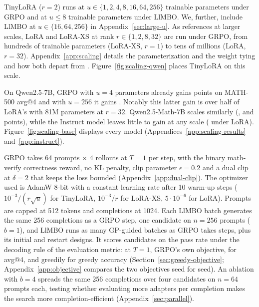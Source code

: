 \documentclass[twoside]{article}
\newcommand{\llmbo}{LlMBO}
\begin{document}
TinyLoRA ($r = 2$) runs at $u \in \{1, 2, 4, 8, 16, 64, 256\}$ trainable parameters under GRPO and at $u \le 8$ trainable parameters under \llmbo{}. We, further, include \llmbo{} at $u \in \{16, 64, 256\}$ in Appendix~\ref{sec:large-u}. As references at larger scales, LoRA and LoRA-XS at rank $r \in \{1, 2, 8, 32\}$ are run under GRPO, from hundreds of trainable parameters (LoRA-XS, $r = 1$) to tens of millions (LoRA, $r = 32$). Appendix~\ref{app:scaling} details the parameterization and the weight tying and how both depart from \citet{morris2026learning}. Figure~\ref{fig:scaling-qwen} places TinyLoRA on this scale. 

On Qwen2.5-7B, GRPO with $u = 4$ parameters already gains \gainGrpoMeanQwenUFourMathFive{} points on MATH-500 avg@4 and with $u = 256$ it gains \gainGrpoMeanQwenUTwoFiftySixMathFive{}. Notably this latter gain is over half of LoRA's \loraGainMeanQwenMathFive{} with 81M parameters at $r = 32$. Qwen2.5-Math-7B scales similarly (\gainGrpoMeanMathUFourMathFive{}, \gainGrpoMeanMathUTwoFiftySixMathFive{} and \loraGainMeanMathMathFive{} points), while the Instruct model leaves little to gain at any scale (\loraGainMeanInstMathFive{} under LoRA). Figure~\ref{fig:scaling-base} displays every model (Appendices~\ref{app:scaling-results} and~\ref{app:instruct}).

GRPO takes 64 prompts $\times$ 4 rollouts at $T = 1$ per step, with the binary math-verify correctness reward, no KL penalty, clip parameter $\epsilon = 0.2$ and a dual clip at $\delta = 2$ that keeps the loss bounded (Appendix~\ref{app:dual-clip}).
The optimizer used is AdamW 8-bit with a constant learning rate after 10 warm-up steps ($10^{-3}/(r\sqrt{u})$ for TinyLoRA, $10^{-3}/r$ for LoRA-XS, $5 \cdot 10^{-6}$ for LoRA).
Prompts are capped at 512 tokens and completions at 1024. Each \llmbo{} batch generates the same 256 completions as a GRPO step, one candidate on $n = 256$ prompts ($b = 1$), and \llmbo{} runs as many GP-guided batches as GRPO takes steps, plus its initial and restart designs. It scores candidates on the pass rate under the decoding rule of the evaluation metric: at $T = 1$, GRPO's own objective, for avg@4, and greedily for greedy accuracy (Section~\ref{sec:greedy-objective}; Appendix~\ref{app:objective} compares the two objectives seed for seed). An ablation with $b = 4$ spreads the same 256 completions over four candidates on $n = 64$ prompts each, testing whether evaluating more adapters per completion makes the search more completion-efficient (Appendix~\ref{sec:parallel}).
\end{document}
